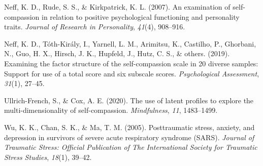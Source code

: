\begin{appendix}
\begin{CSLReferences}{1}{0}
\leavevmode\hypertarget{ref-neff2007examination}{}%
Neff, K. D., Rude, S. S., \& Kirkpatrick, K. L. (2007). An examination
of self-compassion in relation to positive psychological functioning and
personality traits. \emph{Journal of Research in Personality},
\emph{41}(4), 908--916.

\leavevmode\hypertarget{ref-neff2019examining}{}%
Neff, K. D., Tóth-Király, I., Yarnell, L. M., Arimitsu, K., Castilho,
P., Ghorbani, N., Guo, H. X., Hirsch, J. K., Hupfeld, J., Hutz, C. S.,
\& others. (2019). Examining the factor structure of the self-compassion
scale in 20 diverse samples: Support for use of a total score and six
subscale scores. \emph{Psychological Assessment}, \emph{31}(1), 27--45.

\leavevmode\hypertarget{ref-ullrich2020use}{}%
Ullrich-French, S., \& Cox, A. E. (2020). The use of latent profiles to
explore the multi-dimensionality of self-compassion. \emph{Mindfulness},
\emph{11}, 1483--1499.

\leavevmode\hypertarget{ref-wu2005posttraumatic}{}%
Wu, K. K., Chan, S. K., \& Ma, T. M. (2005). Posttraumatic stress,
anxiety, and depression in survivors of severe acute respiratory
syndrome (SARS). \emph{Journal of Traumatic Stress: Official Publication
of The International Society for Traumatic Stress Studies},
\emph{18}(1), 39--42.

\end{CSLReferences}
\end{appendix}

